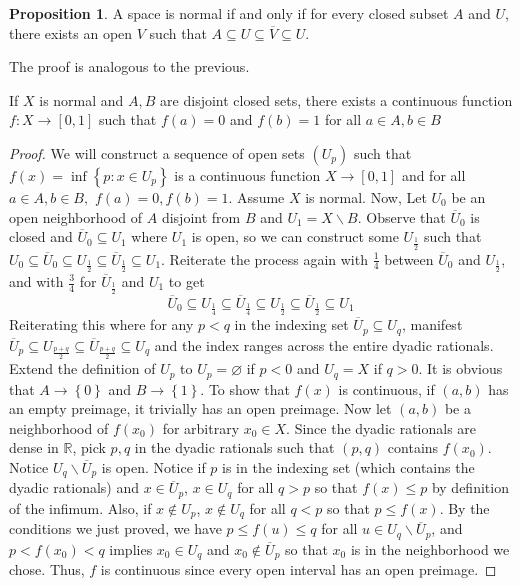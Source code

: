 \documentclass[12pt,reqno]{amsart}
\numberwithin{theorem}{section}
\theoremstyle{definition}
\theoremstyle{remark}
\numberwithin{equation}{section}
\newcommand{\set}[1]{\left \{ #1 \right \}}
\theoremstyle{definition}
\newtheorem{prop}[theorem]{Proposition}
\begin{document}
\begin{prop}
    A space is normal if and only if for every closed subset $A$ and $U$, there exists an open $V$ such that $A \subseteq U\subseteq \overline V \subseteq U $.
\end{prop}
The proof is analogous to the previous.
\begin{theorem}
    If $X$ is normal and $A,B$ are disjoint closed sets, there exists a continuous function $f:X\rightarrow [0,1]$ such that $f(a)=0$ and $f(b) = 1$ for all $a\in A,b\in B$
\end{theorem}
\begin{proof}
    We will construct a sequence of open sets $(U_p)$ such that $f(x)=\inf \set{p : x \in U_p}$ is a continuous function $X \rightarrow [0,1]$ and for all $a \in A, b \in B,$ $f(a)=0,f(b)=1$. Assume $X$ is normal. Now, Let $U_0$ be an open neighborhood of $A$ disjoint from $B$ and $U_1 = X\backslash B$. Observe that $\overline U_0$ is closed and $\overline U_0 \subseteq U_1$ where $U_1$ is open, so we can construct some $U_{\frac 1 2}$ such that $U_0\subseteq \overline U_0 \subseteq U_{\frac 1 2} \subseteq \overline U_{\frac 1 2} \subseteq U_1$. Reiterate the process again with $\frac 1 4$ between $\overline U_0$ and $U_\frac 1 2$, and with $\frac 3 4$ for $\overline U_\frac 1 2$ and $U_1$ to get $$\overline U_0 \subseteq U_\frac 1 4 \subseteq \overline U_\frac 1 4 \subseteq U_\frac 1 2 \subseteq \overline U_\frac 12 \subseteq U_1$$
    Reiterating this where for any $p < q $ in the indexing set $\overline U_p \subseteq U_q$, manifest $\overline U_p \subseteq U_{\frac{p+q}{2}} \subseteq \overline U_{\frac{p+q}{2}} \subseteq U_q$ and the index ranges across the entire dyadic rationals.
    Extend the definition of $U_p$ to $U_p = \varnothing$ if $p < 0$ and $U_q = X$ if $q > 0$. It is obvious that $A \rightarrow \set{0}$ and $B \rightarrow \set{1}$. To show that $f(x)$ is continuous, if $(a,b)$ has an empty preimage, it trivially has an open preimage. Now let $(a,b)$ be a neighborhood of $f(x_0)$ for arbitrary $x_0 \in X$. Since the dyadic rationals are dense in $\mathbb R$, pick $p,q$ in the dyadic rationals such that $(p,q)$ contains $f(x_0)$. Notice $U_q \backslash \overline U_p$ is open. Notice if $p$ is in the indexing set (which contains the dyadic rationals) and $x \in \overline U_p$, $x \in U_q$ for all $q > p$ so that $f(x) \leq p$ by definition of the infimum. Also, if $x \notin U_p$, $x \notin U_q$ for all $q < p$ so that $p \leq f(x) $. By the conditions we just proved, we have $p \leq f(u)  \leq q$ for all $u \in U_q \backslash \overline U_p$, and $p < f(x_0) < q$ implies $x_0 \in U_q$ and $x_0 \notin \overline U_p$ so that $x_0$ is in the neighborhood we chose. Thus, $f$ is continuous since every open interval has an open preimage.
\end{proof}
\end{document}

